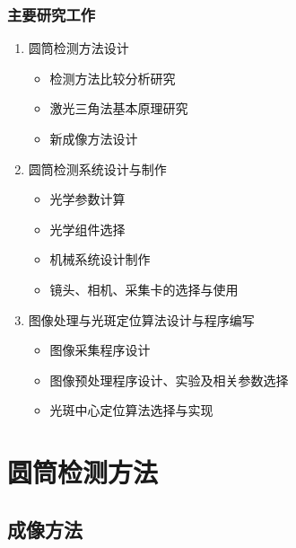\documentclass{beamer}
\begin{document}
\begin{frame}[shrink,c]
  \frametitle{主要研究工作}
    \begin{enumerate}
    \item<1-|alert@1>
    圆筒检测方法设计
      \begin{itemize}
      \item
      检测方法比较分析研究
      \item
      激光三角法基本原理研究
      \item
      新成像方法设计
      \end{itemize}
    \item<2-|alert@2>
    圆筒检测系统设计与制作
      \begin{itemize}
      \item
      光学参数计算
      \item
      光学组件选择
      \item
      机械系统设计制作
      \item
      镜头、相机、采集卡的选择与使用
      \end{itemize}
    \item<3-|alert@3>
    图像处理与光斑定位算法设计与程序编写
      \begin{itemize}
      \item
      图像采集程序设计
      \item
      图像预处理程序设计、实验及相关参数选择
      \item
      光斑中心定位算法选择与实现
      \end{itemize}
    \end{enumerate}
\end{frame}

\section{圆筒检测方法}

\subsection{成像方法}
\end{document}
